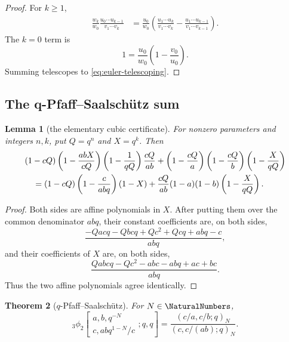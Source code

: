 \documentclass[11pt,oneside]{article}
\newtheorem{theorem}{Theorem}[section]
\newtheorem{lemma}[theorem]{Lemma}
\theoremstyle{definition}
\begin{document}
\begin{proof}
For $k\ge1$,
\begin{align*}
 \frac{w_k}{w_0}\frac{u_0\cdots u_{k-1}}{v_1\cdots v_k}
 &=\frac{u_0}{w_0}
 \left(\frac{u_1\cdots u_k}{v_1\cdots v_k}
       -\frac{u_1\cdots u_{k-1}}{v_1\cdots v_{k-1}}\right).
\end{align*}
The $k=0$ term is
\[
 1=\frac{u_0}{w_0}\left(1-\frac{v_0}{u_0}\right).
\]
Summing telescopes to \eqref{eq:euler-telescoping}.
\end{proof}

\subsection{The q-Pfaff--Saalsch\"utz sum}

\begin{lemma}[the elementary cubic certificate]\label{lem:pfaff-certificate}
For nonzero parameters and integers $n,k$, put $Q=q^n$ and $X=q^k$. Then
\begin{align}
 &(1-cQ)\left(1-\frac{abX}{cQ}\right)
 \left(1-\frac1{qQ}\right)\frac{cQ}{ab}
 +\left(1-\frac{cQ}{a}\right)
  \left(1-\frac{cQ}{b}\right)
  \left(1-\frac{X}{qQ}\right)\notag\\
 &\quad=(1-cQ)\left(1-\frac{c}{abq}\right)(1-X)
 +\frac{cQ}{ab}(1-a)(1-b)
  \left(1-\frac{X}{qQ}\right).
\label{eq:pfaff-certificate}
\end{align}
\end{lemma}

\begin{proof}
Both sides are affine polynomials in $X$. After putting them over the common denominator $abq$, their constant coefficients are, on both sides,
\[
 \frac{-Qacq-Qbcq+Qc^2+Qcq+abq-c}{abq},
\]
and their coefficients of $X$ are, on both sides,
\[
 \frac{Qabcq-Qc^2-abc-abq+ac+bc}{abq}.
\]
Thus the two affine polynomials agree identically.
\end{proof}

\begin{theorem}[$q$-Pfaff--Saalsch\"utz]\label{thm:q-pfaff}
For $N\in\NaturalNumbers$,
\begin{equation}\label{eq:q-pfaff}
 {}_3\phi_2\!\left[
 \begin{matrix}a,b,q^{-N}\\c,abq^{1-N}/c\end{matrix};q,q\right]
 =\frac{(c/a,c/b;q)_N}{(c,c/(ab);q)_N}.
\end{equation}
\end{theorem}
\end{document}
